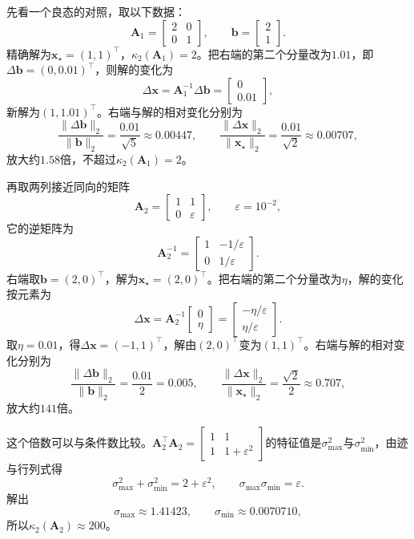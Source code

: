 \begin{example}[良态矩阵与近平行列矩阵]
\label{ex:ls-rhs-perturbation-near-parallel}
先看一个良态的对照，取以下数据：
\[
 \bm A_1=\begin{bmatrix}2&0\\0&1\end{bmatrix},\qquad \bm b=\begin{bmatrix}2\\1\end{bmatrix}.
\]
精确解为$\bm x_\star=(1,1)^\top$，$\kappa_2(\bm A_1)=2$。把右端的第二个分量改为$1.01$，即$\Delta\bm b=(0,0.01)^\top$，则解的变化为
\[
 \Delta\bm x=\bm A_1^{-1}\Delta\bm b=\begin{bmatrix}0\\0.01\end{bmatrix},
\]
新解为$(1,1.01)^\top$。右端与解的相对变化分别为
\[
 \frac{\lVert\Delta\bm b\rVert_2}{\lVert\bm b\rVert_2}=\frac{0.01}{\sqrt5}\approx0.00447,\qquad
 \frac{\lVert\Delta\bm x\rVert_2}{\lVert\bm x_\star\rVert_2}=\frac{0.01}{\sqrt2}\approx0.00707,
\]
放大约$1.58$倍，不超过$\kappa_2(\bm A_1)=2$。

再取两列接近同向的矩阵
\[
 \bm A_2=\begin{bmatrix}1&1\\0&\varepsilon\end{bmatrix},\qquad \varepsilon=10^{-2},
\]
它的逆矩阵为
\[
 \bm A_2^{-1}=\begin{bmatrix}1&-1/\varepsilon\\0&1/\varepsilon\end{bmatrix}.
\]
右端取$\bm b=(2,0)^\top$，解为$\bm x_\star=(2,0)^\top$。把右端的第二个分量改为$\eta$，解的变化按元素为
\[
 \Delta\bm x=\bm A_2^{-1}\begin{bmatrix}0\\\eta\end{bmatrix}=\begin{bmatrix}-\eta/\varepsilon\\\eta/\varepsilon\end{bmatrix}.
\]
取$\eta=0.01$，得$\Delta\bm x=(-1,1)^\top$，解由$(2,0)^\top$变为$(1,1)^\top$。右端与解的相对变化分别为
\[
 \frac{\lVert\Delta\bm b\rVert_2}{\lVert\bm b\rVert_2}=\frac{0.01}{2}=0.005,\qquad
 \frac{\lVert\Delta\bm x\rVert_2}{\lVert\bm x_\star\rVert_2}=\frac{\sqrt2}{2}\approx0.707,
\]
放大约$141$倍。

这个倍数可以与条件数比较。$\bm A_2^\top\bm A_2=\left[\begin{smallmatrix}1&1\\1&1+\varepsilon^2\end{smallmatrix}\right]$的特征值是$\sigma_{\max}^2$与$\sigma_{\min}^2$，由迹与行列式得
\[
 \sigma_{\max}^2+\sigma_{\min}^2=2+\varepsilon^2,\qquad \sigma_{\max}\sigma_{\min}=\varepsilon .
\]
解出
\[
 \sigma_{\max}\approx1.41423,\qquad \sigma_{\min}\approx0.0070710,
\]
所以$\kappa_2(\bm A_2)\approx200$。


\end{example}
